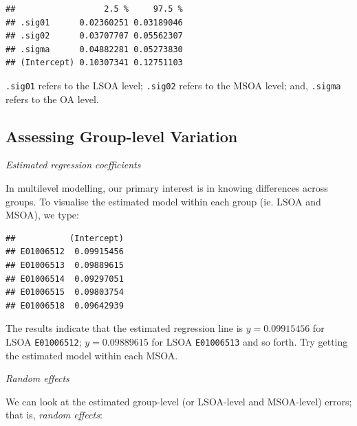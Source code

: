 \documentclass[]{book}
\newenvironment{Shaded}{\begin{snugshade}}{\end{snugshade}}
\newcommand{\KeywordTok}[1]{\textcolor[rgb]{0.13,0.29,0.53}{\textbf{#1}}}
\newcommand{\DecValTok}[1]{\textcolor[rgb]{0.00,0.00,0.81}{#1}}
\newcommand{\StringTok}[1]{\textcolor[rgb]{0.31,0.60,0.02}{#1}}
\newcommand{\OperatorTok}[1]{\textcolor[rgb]{0.81,0.36,0.00}{\textbf{#1}}}
\newcommand{\NormalTok}[1]{#1}
\begin{document}
\begin{verbatim}
##                  2.5 %     97.5 %
## .sig01      0.02360251 0.03189046
## .sig02      0.03707707 0.05562307
## .sigma      0.04882281 0.05273830
## (Intercept) 0.10307341 0.12751103
\end{verbatim}

\texttt{.sig01} refers to the LSOA level; \texttt{.sig02} refers to the
MSOA level; and, \texttt{.sigma} refers to the OA level.

\subsection{Assessing Group-level
Variation}\label{assessing-group-level-variation}

\emph{Estimated regression coefficients}

In multilevel modelling, our primary interest is in knowing differences
across groups. To visualise the estimated model within each group (ie.
LSOA and MSOA), we type:

\begin{Shaded}
\end{Shaded}

\begin{verbatim}
##           (Intercept)
## E01006512  0.09915456
## E01006513  0.09889615
## E01006514  0.09297051
## E01006515  0.09803754
## E01006518  0.09642939
\end{verbatim}

The results indicate that the estimated regression line is
\(y = 0.09915456\) for LSOA \texttt{E01006512}; \(y = 0.09889615\) for
LSOA \texttt{E01006513} and so forth. Try getting the estimated model
within each MSOA.

\emph{Random effects}

We can look at the estimated group-level (or LSOA-level and MSOA-level)
errors; that is, \emph{random effects}:

\begin{Shaded}
\end{Shaded}
\end{document}
